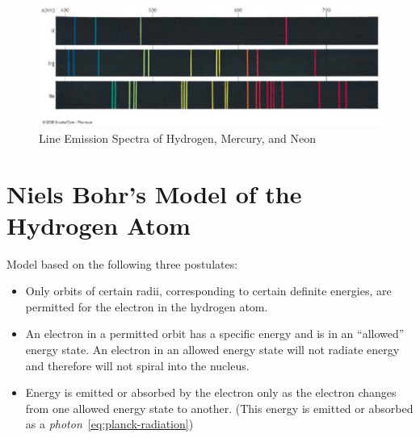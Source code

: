 \documentclass[
	chapter=7,
	title={Quantum Theory {\&} the Electronic Structure of Atoms},
	showanswers=true,
]{chem122notes}
\begin{document}
\begin{figure}[H]
	\centering
	\includegraphics[width=\textwidth]{chapter7/line-emission-spectra}
	\caption{Line Emission Spectra of Hydrogen, Mercury, and Neon}
	\label{fig:line-emission-spectra}
\end{figure}

\section{Niels Bohr's Model of the Hydrogen Atom}\label{sec:niels-bohr's-model-of-the-hydrogen-atom}
Model based on the following three postulates:
\begin{itemize}
	\item Only orbits of certain radii, corresponding to certain definite energies, are permitted for the electron in the hydrogen atom.
	\item An electron in a permitted orbit has a specific energy and is in an ``allowed'' energy state.
	An electron in an allowed energy state will not radiate energy and therefore will not spiral into the nucleus.
	\item Energy is emitted or absorbed by the electron only as the electron changes from one allowed energy state to another.
	(This energy is emitted or absorbed as a \emph{photon}~\eqref{eq:planck-radiation})
\end{itemize}
\end{document}
